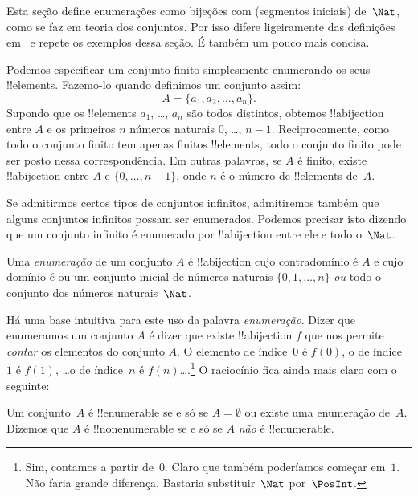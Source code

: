 \documentclass[../../../include/open-logic-section]{subfiles}
\begin{document}


\begin{editorial}
  Esta seção define enumerações como bijeções com (segmentos iniciais)
  de~$\Nat$, como se faz em teoria dos conjuntos. Por isso difere ligeiramente
  das definições em~ e repete os exemplos dessa seção. É também
  um pouco mais concisa.
\end{editorial}

Podemos especificar um conjunto finito simplesmente enumerando os seus
!!{element}s. Fazemo-lo quando definimos um conjunto assim:
\[
  A = \{a_1, a_2, \ldots, a_n\}.
\]
Supondo que os !!{element}s $a_1$, \dots, $a_n$ são todos distintos,
obtemos !!a{bijection} entre $A$ e os primeiros $n$ números naturais $0$, \dots,
$n-1$. Reciprocamente, como todo o conjunto finito tem apenas finitos
!!{element}s, todo o conjunto finito pode ser posto nessa correspondência. Em
outras palavras, se $A$ é finito, existe !!a{bijection} entre $A$ e $\{0, \dots,
n-1\}$, onde $n$ é o número de !!{element}s de~$A$.

Se admitirmos certos tipos de conjuntos infinitos, admitiremos também que alguns
conjuntos infinitos possam ser enumerados. Podemos precisar isto dizendo que um
conjunto infinito é enumerado por !!a{bijection} entre ele e todo o~$\Nat$.

\begin{defn}
Uma \emph{enumeração} de um conjunto $A$ é !!a{bijection} cujo contradomínio é
$A$ e cujo domínio é ou um conjunto inicial de números naturais $\{0,
1, \ldots, n\}$ \emph{ou} todo o conjunto dos números naturais~$\Nat$.
\end{defn}

\begin{explain}
Há uma base intuitiva para este uso da palavra \emph{enumeração}. Dizer que
enumeramos um conjunto $A$ é dizer que existe !!a{bijection} $f$ que nos permite
\emph{contar} os elementos do conjunto $A$. O elemento de índice~$0$ é $f(0)$, o
de índice~$1$ é $f(1)$, \ldots o de índice~$n$ é $f(n)$\ldots.\footnote{Sim,
contamos a partir de~$0$. Claro que também poderíamos começar em~$1$. Não faria
grande diferença. Bastaria substituir~$\Nat$ por~$\PosInt$.} O raciocínio fica
ainda mais claro com o seguinte:
\end{explain}

\begin{defn}
  Um conjunto~$A$ é !!{enumerable} se e só se $A = \emptyset$ ou existe
  uma enumeração de~$A$. Dizemos que $A$ é !!{nonenumerable} se e só se $A$
  \emph{não} é !!{enumerable}.
\end{defn}
\end{document}
